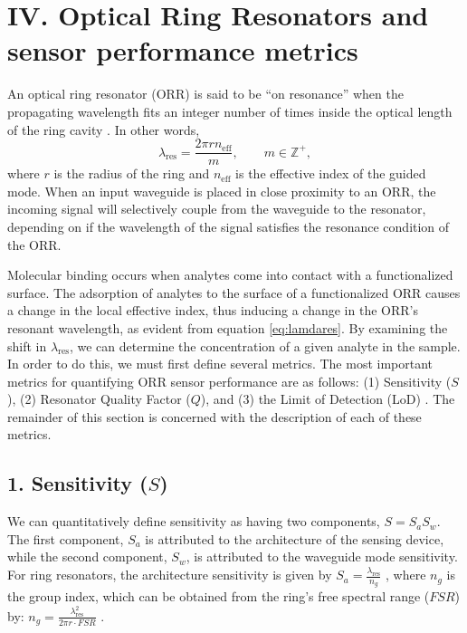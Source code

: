 \documentclass[aps,prl,twocolumn, superscriptaddress,nobalancelastpage]{revtex4}
\begin{document}
\section{IV. Optical Ring Resonators and sensor performance metrics}
\vspace{-1em}

An optical ring resonator (ORR) is said to be ``on resonance'' when the propagating wavelength fits an integer number of times inside the optical length of the ring cavity \cite{sipORRs}. In other words, 
\begin{equation}
    \lambda_\text{res} = \frac{2\pi r n_\text{eff}}{m}, \qquad m \in \mathbb{Z}^+,
    \label{eq:lamdares}
\end{equation}
where $r$ is the radius of the ring and $n_\text{eff}$ is the effective index of the guided mode. When an input waveguide is placed in close proximity to an ORR, the incoming signal will selectively couple from the waveguide to the resonator, depending on if the wavelength of the signal satisfies the resonance condition of the ORR.

Molecular binding occurs when analytes come into contact with a functionalized surface. The adsorption of analytes to the surface of a functionalized ORR causes a change in the local effective index, thus inducing a change in the ORR's resonant wavelength, as evident from equation \eqref{eq:lamdares}. By examining the shift in $\lambda_\text{res}$, we can determine the concentration of a given analyte in the sample. In order to do this, we must first define several metrics. The most important metrics for quantifying ORR sensor performance are as follows: (1) Sensitivity ($S$), (2) Resonator Quality Factor ($Q$), and (3) the Limit of Detection (LoD) \cite{sipresonators}. The remainder of this section is concerned with the description of each of these metrics.

\vspace{-1em}
\subsection{1. Sensitivity ($S$)}
\vspace{-1em}

We can quantitatively define sensitivity as having two components, $S= S_aS_w$. The first component, $S_a$ is attributed to the architecture of the sensing device, while the second component, $S_w$, is attributed to the waveguide mode sensitivity. For ring resonators, the architecture sensitivity is given by $S_a = \frac{\lambda_\text{res}}{n_g}$ \cite{swg1}, where $n_g$ is the group index, which can be obtained from the ring's free spectral range ($FSR$) by: $n_g = \frac{\lambda_\text{res}^2}{2\pi r \cdot FSR}$ \cite{swg3}.
\end{document}
